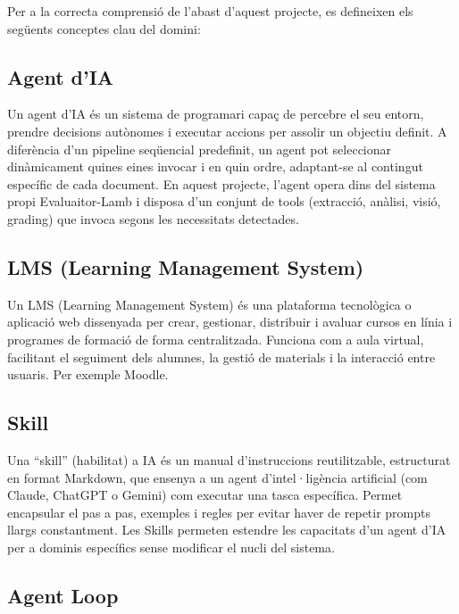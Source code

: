 \documentclass[12pt,a4paper,twoside]{report}
\begin{document}
Per a la correcta comprensi\'o de l'abast d'aquest projecte, es defineixen els seg\"uents conceptes clau del domini:

\subsection{Agent d'IA}
\label{subsec:agent-ia}

Un agent d'IA \'es un sistema de programari capa\c{c} de percebre el seu entorn, prendre decisions aut\`onomes i executar accions per assolir un objectiu definit. A difer\`encia d'un pipeline seq\"uencial predefinit, un agent pot seleccionar din\`amicament quines eines invocar i en quin ordre, adaptant-se al contingut espec\'ific de cada document. En aquest projecte, l'agent opera dins del sistema propi Evaluaitor-Lamb i disposa d'un conjunt de tools (extracci\'o, an\`alisi, visi\'o, grading) que invoca segons les necessitats detectades.

\subsection{LMS (Learning Management System)}
\label{subsec:lms}

Un LMS (Learning Management System) \'es una plataforma tecnol\`ogica o aplicaci\'o web dissenyada per crear, gestionar, distribuir i avaluar cursos en l\'inia i programes de formaci\'o de forma centralitzada. Funciona com a aula virtual, facilitant el seguiment dels alumnes, la gesti\'o de materials i la interacci\'o entre usuaris. Per exemple Moodle.

\subsection{Skill}
\label{subsec:skill}

Una ``skill'' (habilitat) a IA \'es un manual d'instruccions reutilitzable, estructurat en format Markdown, que ensenya a un agent d'intel·lig\`encia artificial (com Claude, ChatGPT o Gemini) com executar una tasca espec\'ifica. Permet encapsular el pas a pas, exemples i regles per evitar haver de repetir prompts llargs constantment. Les Skills permeten estendre les capacitats d'un agent d'IA per a dominis espec\'ifics sense modificar el nucli del sistema.

\subsection{Agent Loop}
\label{subsec:agent-loop}
\end{document}
